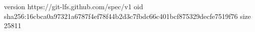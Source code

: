 version https://git-lfs.github.com/spec/v1
oid sha256:16cbca0a97321a6787f4ef78f44b2d3c7fbdc66c401bcf875329decfe7519f76
size 25811
